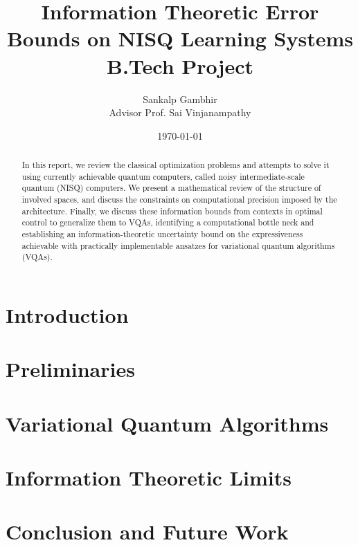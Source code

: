 \documentclass[
    paper=a4, 
    lang=en, 
    font=kpfonts,
    ptsize=12pt,
    titles=bf,
    hanging-titles=true,
    cleanlook, printdayoff, %
    final %
]
{skrapport}
\title{
    {\huge Information Theoretic Error Bounds on NISQ Learning Systems} \\
    {\large B.Tech Project}
    }
\author[sgambhir@iitb.ac.in]{
    Sankalp Gambhir \\ 
    \vspace{1em}
        {
            \normalsize 
            \hspace{0.1em} 
            Advisor \hspace{0.5em}
            Prof. Sai Vinjanampathy
        }
    \vspace{-1.3em}
}
\date{\today}
\newcounter{notes}
\begin{document}
    \begin{titlepage}
        \maketitle
        \begin{abstract}
            In this report, we review the classical optimization problems and
            attempts to solve it using currently achievable quantum computers,
            called noisy intermediate-scale quantum (NISQ) computers. We present
            a mathematical review of the structure of involved spaces, and
            discuss the constraints on computational precision imposed by the
            architecture. Finally, we discuss these information bounds from
            contexts in optimal control to generalize them to VQAs, identifying
            a computational bottle neck and establishing an
            information-theoretic uncertainty bound on the expressiveness
            achievable with practically implementable ansatzes for variational
            quantum algorithms (VQAs).
        \end{abstract}

        \listofnotes
    \end{titlepage}

    \tableofcontents \pagebreak

    \section{Introduction}
        \label{sec:intro}
        
    
    \section{Preliminaries}
        \label{sec:prelim}
        

    \section{Variational Quantum Algorithms}
        \label{sec:vqa}
        
    
    \section{Information Theoretic Limits}
        \label{sec:infolimits}
        

    \section{Conclusion and Future Work}
        \label{sec:future}
        
\end{document}
